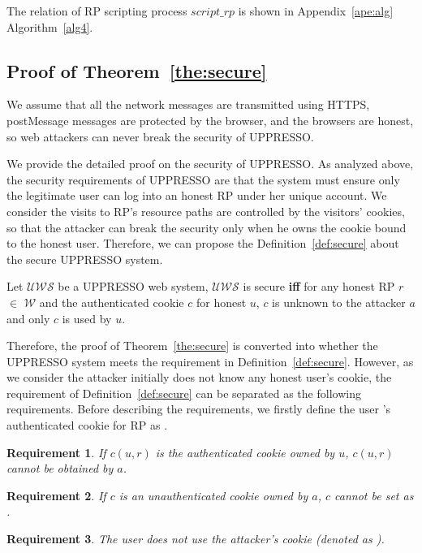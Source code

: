 \begin{appendices}
The relation of RP scripting process $script\_rp$ is shown in Appendix~\ref{ape:alg} Algorithm~\ref{alg4}.



\subsection{Proof of Theorem~\ref{the:secure}}


\newtheorem{redef}{Definition}
\newtheorem{req}{Requirement}
\newtheorem{relemma}{Lemma}

We assume that all the network messages are transmitted using HTTPS, postMessage messages are protected by the browser, and the browsers are  honest, so web attackers can never break the security of UPPRESSO.

We provide the detailed proof on the security of UPPRESSO. As analyzed above, the security requirements of UPPRESSO are that the system must ensure only the legitimate user can log into an honest RP under her unique account. We consider the visits to RP's resource paths are controlled by the visitors' cookies, so that the attacker can break the security only when he owns the cookie bound to the honest user. Therefore, we can propose the Definition~\ref{def:secure} about the secure UPPRESSO system.
\begin{definition}
Let $\mathcal{UWS}$ be a UPPRESSO web system, $\mathcal{UWS}$ is secure \textbf{iff} for any honest RP $r$ $\in $ $\mathcal{W}$ and  the authenticated cookie $c$ for honest $u$,  $c$ is unknown to the attacker $a$ and only $c$ is used by $u$.
\end{definition}
Therefore, the proof of Theorem~\ref{the:secure} is converted into whether the UPPRESSO system meets the requirement in Definition~\ref{def:secure}. However, as we consider the attacker initially does not know any honest user's cookie, the requirement of Definition~\ref{def:secure} can be separated as the following requirements. Before describing the requirements, we firstly define the user 's authenticated cookie for RP  as .
\begin{req}
If $c(u,r)$ is the authenticated cookie owned by $u$, $c(u,r)$ cannot be obtained by $a$.
\label{req:cookie1}
\end{req}
\begin{req}
If $c$ is an unauthenticated cookie owned by $a$, $c$ cannot be set as .
\label{req:cookie2}
\end{req}
\begin{req}
The user  does not use the attacker's cookie (denoted as ).
\label{req:cookie3}
\end{req}



\end{appendices}
